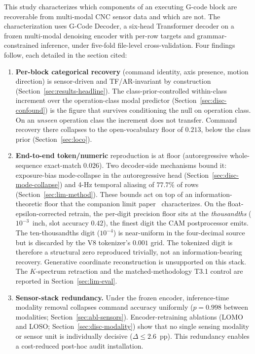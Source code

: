 \documentclass[sensors,article,submit,moreauthors,pdftex]{Definitions/mdpi}
\newcommand{\modelname}{G-Code Decoder}
\begin{document}
This study characterizes which components of an executing G-code block are recoverable from multi-modal CNC sensor data and which are not. The characterization uses \modelname{}, a six-head Transformer decoder on a frozen multi-modal denoising encoder with per-row targets and grammar-constrained inference, under five-fold file-level cross-validation. Four findings follow, each detailed in the section cited:

\begin{enumerate}[label=(\arabic*), leftmargin=*, nosep]
\item \textbf{Per-block categorical recovery} (command identity, axis presence, motion direction) is sensor-driven and TF/AR-invariant by construction (Section~\ref{sec:results-headline}). The class-prior-controlled within-class increment over the operation-class modal predictor (Section~\ref{sec:disc-confound}) is the figure that survives conditioning the null on operation class. On an \emph{unseen} operation class the increment does not transfer. Command recovery there collapses to the open-vocabulary floor of $0.213$, below the class prior (Section~\ref{sec:loco}).
\item \textbf{End-to-end token/numeric} reproduction is at floor (autoregressive whole-sequence exact-match $0.026$). Two decoder-side mechanisms bound it: exposure-bias mode-collapse in the autoregressive head (Section~\ref{sec:disc-mode-collapse}) and 4-Hz temporal aliasing of $77.7\%$ of rows (Section~\ref{sec:lim-method}). These bounds act on top of an information-theoretic floor that the companion limit paper~\cite{paperB_entropy} characterizes. On the float-epsilon-corrected retrain, the per-digit precision floor sits at the \emph{thousandths} ($10^{-3}$~inch, slot accuracy $0.42$), the finest digit the CAM postprocessor emits. The ten-thousandths digit ($10^{-4}$) is near-uniform in the four-decimal source but is discarded by the V8 tokenizer's $0.001$ grid. The tokenized digit is therefore a structural zero reproduced trivially, not an information-bearing recovery. Generative coordinate reconstruction is unsupported on this stack. The $K$-spectrum retraction and the matched-methodology T3.1 control are reported in Section~\ref{sec:lim-eval}.
\item \textbf{Sensor-stack redundancy.} Under the frozen encoder, inference-time modality removal collapses command accuracy uniformly ($p\!=\!0.998$ between modalities; Section~\ref{sec:abl-sensors}). Encoder-retraining ablations (LOMO and LOSO; Section~\ref{sec:disc-modality}) show that no single sensing modality or sensor unit is individually decisive ($\Delta\!\le\!2.6$~pp). This redundancy enables a cost-reduced post-hoc audit installation.

\end{enumerate}
\end{document}

